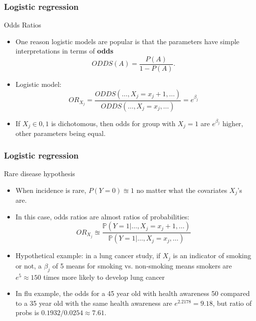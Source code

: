 \documentclass[handout]{beamer}
\newcommand{\Pp}{\mathbb{P}}
\begin{document}
   \begin{frame} \frametitle{Logistic regression}

   \begin{block}
   {Odds Ratios}

   \begin{itemize}
   \item     One reason logistic models are popular is that the
       parameters have simple interpretations in terms of {\bf odds}
   $$
   ODDS(A) = \frac{P(A)}{1-P(A)}.
   $$

   \item Logistic model:
   $$
   OR_{X_j} = \frac{ODDS(\dots, X_j=x_j+1, \dots)}{ODDS(\dots, X_j=x_j, \dots)} = e^{\beta_j}
   $$


   \item If $X_j \in {0, 1}$ is dichotomous, then odds for group with $X_j = 1$ are
       $e^{\beta_j}$ higher, other parameters being equal.

   \end{itemize}
   \end{block}
   \end{frame}


   \begin{frame} \frametitle{Logistic regression}

   \begin{block}
         {Rare disease hypothesis}
         \begin{itemize}
         \item When incidence is rare, $P(Y=0)\approxeq 1$ no matter
   what the covariates $X_j$'s are.

   \item In this case, odds ratios are almost ratios of probabilities:
   $$
   OR_{X_j} \approxeq \frac{\Pp(Y=1|\dots, X_j=x_j+1, \dots)}{\Pp(Y=1|\dots, X_j=x_j, \dots)}
   $$

   \item Hypothetical example: in a lung cancer study, if $X_j$ is an indicator of smoking or not, a $\beta_j$ of 5 means for smoking vs. non-smoking means smokers are $e^5 \approx 150$ times more likely to develop lung cancer

   \item In flu example, the odds for a 45 year old with health awareness 50
   compared to a 35 year old with the same health awareness are $e^{2.2178}=9.18$, but ratio of probs is $0.1932/0.0254 \approx 7.61$.

   \end{itemize}
   \end{block}
   \end{frame}
\end{document}
